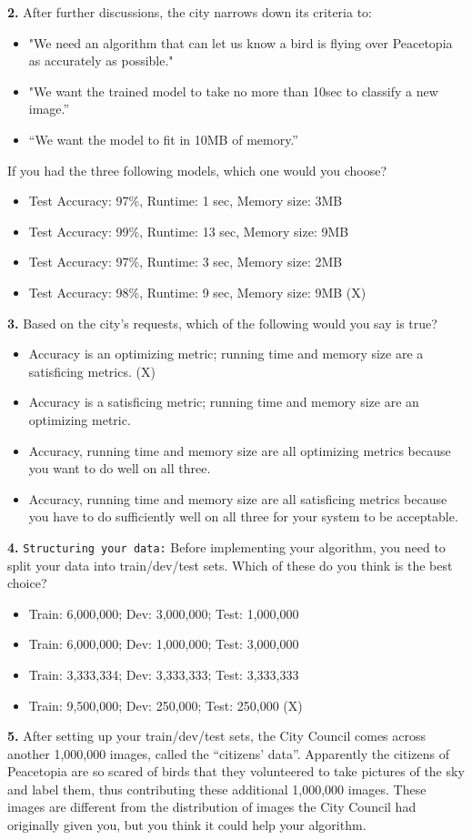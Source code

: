 \textbf{2.} After further discussions, the city narrows down its criteria to:
\begin{itemize}
    \item "We need an algorithm that can let us know a bird is flying over Peacetopia as accurately as possible."
    \item "We want the trained model to take no more than 10sec to classify a new image.”
    \item “We want the model to fit in 10MB of memory.”
\end{itemize}
If you had the three following models, which one would you choose?
\begin{itemize}
    \item Test Accuracy: 97\%, Runtime: 1 sec, Memory size: 3MB
    \item Test Accuracy: 99\%, Runtime: 13 sec, Memory size: 9MB
    \item Test Accuracy: 97\%, Runtime: 3 sec, Memory size: 2MB
    \item Test Accuracy: 98\%, Runtime: 9 sec, Memory size: 9MB (X)
\end{itemize}
\textbf{3.} Based on the city’s requests, which of the following would you say is true?
\begin{itemize}
    \item Accuracy is an optimizing metric; running time and memory size are a satisficing metrics. (X)
    \item Accuracy is a satisficing metric; running time and memory size are an optimizing metric.
    \item Accuracy, running time and memory size are all optimizing metrics because you want to do well on all three.
    \item Accuracy, running time and memory size are all satisficing metrics because you have to do sufficiently well on all three for your system to be acceptable.
\end{itemize}
\textbf{4.} \texttt{Structuring your data:} Before implementing your algorithm, you need to split your data into train/dev/test sets. Which of these do you think is the best choice?
\begin{itemize}
    \item Train: 6,000,000; Dev: 3,000,000; Test: 1,000,000
    \item Train: 6,000,000; Dev: 1,000,000; Test: 3,000,000
    \item Train: 3,333,334; Dev: 3,333,333; Test: 3,333,333
    \item Train: 9,500,000; Dev: 250,000; Test: 250,000 (X)
\end{itemize}
\textbf{5.} After setting up your train/dev/test sets, the City Council comes across another 1,000,000 images, called the “citizens’ data”. Apparently the citizens of Peacetopia are so scared of birds that they volunteered to take pictures of the sky and label them, thus contributing these additional 1,000,000 images. These images are different from the distribution of images the City Council had originally given you, but you think it could help your algorithm.

